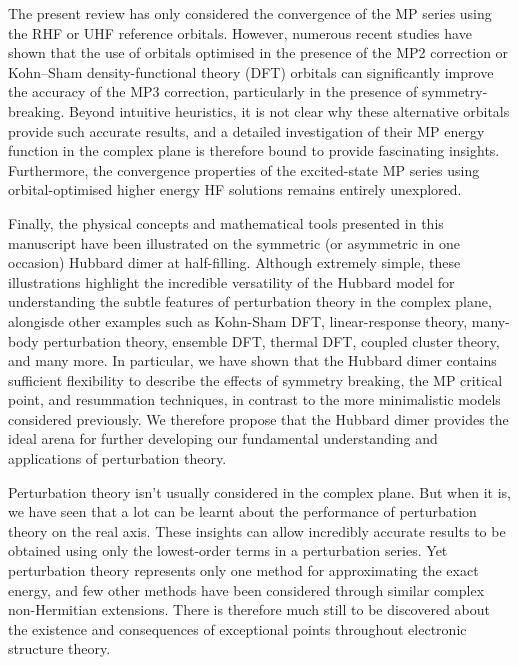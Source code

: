 \documentclass[aps,prb,reprint,noshowkeys,superscriptaddress]{revtex4-1}
\begin{document}
The present review has only considered the convergence of the MP series using the RHF or UHF 
reference orbitals.
However, numerous recent studies have shown that the use of orbitals optimised in the presence of the MP2 
correction\cite{Bozkaya_2011,Neese_2009,Lee_2018} or Kohn--Sham density-functional theory (DFT) orbitals 
can significantly improve the accuracy of the MP3 correction,\cite{Bertels_2019,Rettig_2020}
particularly in the presence of symmetry-breaking.
Beyond intuitive heuristics, it is not clear why these alternative orbitals provide such accurate results, 
and a detailed investigation of their MP energy function in the complex plane is therefore bound to provide
fascinating insights.
Furthermore, the convergence properties of the excited-state MP series using orbital-optimised higher energy 
HF solutions\cite{Gilbert_2008} remains entirely unexplored.\cite{Lee_2019,CarterFenk_2020}

Finally, the physical concepts and mathematical tools presented in this manuscript have been illustrated 
on the symmetric (or asymmetric in one occasion) Hubbard dimer at half-filling.
Although extremely simple, these illustrations highlight the incredible versatility of the Hubbard model
for understanding the subtle features of perturbation theory in the complex plane, alongisde other examples 
such as Kohn-Sham DFT, \cite{Carrascal_2015,Cohen_2016} linear-response theory,\cite{Carrascal_2018} 
many-body perturbation theory,\cite{Romaniello_2009,Romaniello_2012,DiSabatino_2015,Hirata_2015,Tarantino_2017,Olevano_2019} 
ensemble DFT, \cite{Deur_2017,Deur_2018,Senjean_2018,Sagredo_2018,Fromager_2020} thermal DFT,\cite{Smith_2016,Smith_2018} 
coupled cluster theory,\cite{Stein_2014,Henderson_2015,Shepherd_2016} and many more.
In particular, we have shown that the Hubbard dimer contains sufficient flexibility to describe 
the effects of symmetry breaking, the MP critical point, and resummation techniques, in contrast to the more 
minimalistic models considered previously.
We therefore propose that the Hubbard dimer provides the ideal arena for further developing our fundamental understanding
and applications of perturbation theory.

Perturbation theory isn't usually considered in the complex plane. 
But when it is, we have seen that a lot can be learnt about the performance of perturbation theory on the real axis.
These insights can allow incredibly accurate results to be obtained using only the lowest-order terms in a perturbation series.
Yet perturbation theory represents only one method for approximating the exact energy, and few other methods
have been considered through similar complex non-Hermitian extensions.
There is therefore much still to be discovered about the existence and consequences of exceptional points
throughout electronic structure theory.
\end{document}
